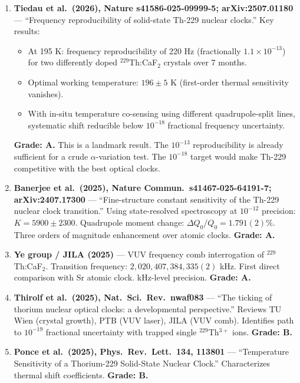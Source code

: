 \documentclass[11pt,a4paper]{article}
\begin{document}
\begin{enumerate}

\item \textbf{Tiedau et al.\ (2026), Nature s41586-025-09999-5; arXiv:2507.01180} --- ``Frequency reproducibility of solid-state Th-229 nuclear clocks.'' Key results:
\begin{itemize}
\item At 195 K: frequency reproducibility of 220 Hz (fractionally $1.1\times10^{-13}$) for two differently doped $^{229}$Th:CaF$_2$ crystals over 7 months.
\item Optimal working temperature: $196\pm5$ K (first-order thermal sensitivity vanishes).
\item With in-situ temperature co-sensing using different quadrupole-split lines, systematic shift reducible below $10^{-18}$ fractional frequency uncertainty.
\end{itemize}
\textbf{Grade: A.} This is a landmark result. The $10^{-13}$ reproducibility is already sufficient for a crude $\alpha$-variation test. The $10^{-18}$ target would make Th-229 competitive with the best optical clocks.

\item \textbf{Banerjee et al.\ (2025), Nature Commun.\ s41467-025-64191-7; arXiv:2407.17300} --- ``Fine-structure constant sensitivity of the Th-229 nuclear clock transition.'' Using state-resolved spectroscopy at $10^{-12}$ precision: $K = 5900 \pm 2300$. Quadrupole moment change: $\Delta Q_0/Q_0 = 1.791(2)\%$. Three orders of magnitude enhancement over atomic clocks. \textbf{Grade: A.}

\item \textbf{Ye group / JILA (2025)} --- VUV frequency comb interrogation of $^{229}$Th:CaF$_2$. Transition frequency: $2{,}020{,}407{,}384{,}335(2)$ kHz. First direct comparison with Sr atomic clock. kHz-level precision. \textbf{Grade: A.}

\item \textbf{Thirolf et al.\ (2025), Nat.\ Sci.\ Rev.\ nwaf083} --- ``The ticking of thorium nuclear optical clocks: a developmental perspective.'' Reviews TU Wien (crystal growth), PTB (VUV laser), JILA (VUV comb). Identifies path to $10^{-19}$ fractional uncertainty with trapped single $^{229}$Th$^{3+}$ ions. \textbf{Grade: B.}

\item \textbf{Ponce et al.\ (2025), Phys.\ Rev.\ Lett.\ 134, 113801} --- ``Temperature Sensitivity of a Thorium-229 Solid-State Nuclear Clock.'' Characterizes thermal shift coefficients. \textbf{Grade: B.}

\end{enumerate}
\end{document}
